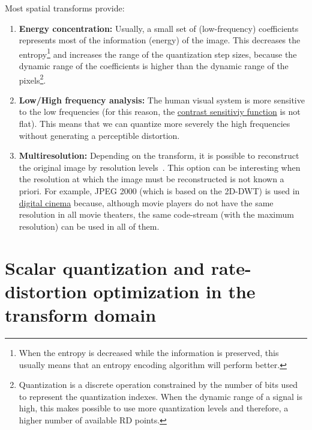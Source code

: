 Most spatial transforms provide:
\begin{enumerate}
\item \textbf{Energy concentration:} Usually, a small set of
  (low-frequency) coefficients represents most of the information
  (energy) of the image. This decreases the entropy\footnote{When the
    entropy is decreased while the information is preserved, this
    usually means that an entropy encoding algorithm will perform
    better.} and increases the range of the quantization step sizes,
  because the dynamic range of the coefficients is higher than the
  dynamic range of the pixels\footnote{Quantization is a discrete
    operation constrained by the number of bits used to represent the
    quantization indexes. When the dynamic range of a signal is high,
    this makes possible to use more quantization levels and therefore,
    a higher number of available RD points.}.
\item \textbf{Low/High frequency analysis:} The human visual system is
  more sensitive to the low frequencies (for this reason, the
  \href{https://en.wikipedia.org/wiki/Contrast_(vision)#Contrast_sensitivity}{contrast
    sensitiviy function} is not flat). This means that we can quantize
  more severely the high frequencies without generating a perceptible
  distortion.
\item \textbf{Multiresolution:} Depending on the transform, it is
  possible to reconstruct the original image by resolution
  levels~\cite{vruiz__DWT}. This option can be interesting when the
  resolution at which the image must be reconstructed is not known a
  priori. For example, JPEG 2000 (which is based on the 2D-DWT) is
  used in \href{https://jpeg.org/jpeg2000/applications.html}{digital
    cinema} because, although movie players do not have the same
  resolution in all movie theaters, the same code-stream (with the
  maximum resolution) can be used in all of them.
\end{enumerate}


\section{Scalar quantization and rate-distortion optimization in the transform domain}

